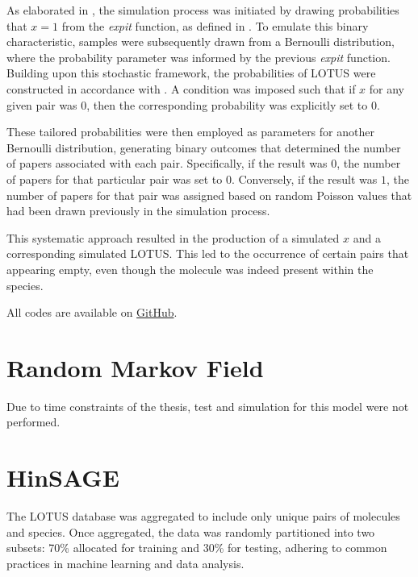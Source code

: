 \documentclass[
11pt, %
english, %
singlespacing, %
headsepline, %
chapterinoneline, %
]{MastersDoctoralThesis} %
\begin{document}
As elaborated in , the simulation process was initiated by drawing probabilities that $x=1$ from the \textit{expit} function, as defined in . 
To emulate this binary characteristic, samples were subsequently drawn from a Bernoulli distribution, where the probability parameter was informed by the previous \textit{expit} function. Building upon this stochastic framework, the probabilities of LOTUS were constructed in accordance with . A  condition was imposed such that if $x$ for any given pair was $0$, then the corresponding probability was explicitly set to $0$.

These tailored probabilities were then employed as parameters for another Bernoulli distribution, generating binary outcomes that determined the number of papers associated with each pair. Specifically, if the result was $0$, the number of papers for that particular pair was set to $0$. Conversely, if the result was $1$, the number of papers for that pair was assigned based on random Poisson values that had been drawn previously in the simulation process.

This systematic approach resulted in the production of a simulated $x$ and a corresponding simulated LOTUS. This led to the occurrence of certain pairs that appearing empty, even though the molecule was indeed present within the species.

All codes are available on \href{https://github.com/commons-research/anticipated-lotus}{GitHub}.
 
\section{Random Markov Field}
Due to time constraints of the thesis, test and simulation for this model were not performed.

\section{HinSAGE}\label{sec:methods:HinSAGE}
The LOTUS database was aggregated to include only unique pairs of molecules and species. Once aggregated, the data was randomly partitioned into two subsets: 70\% allocated for training and 30\% for testing, adhering to common practices in machine learning and data analysis.
\end{document}
